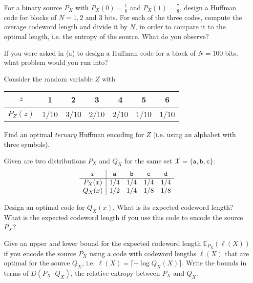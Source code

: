 \documentclass[a4paper,10pt,landscape,twocolumn]{scrartcl}
\begin{document}
\begin{exercise}
	\begin{subex}[(4pt)]
	For a binary source $P_X$ with $P_X(0) = \frac{1}{8}$ and $P_X(1) = \frac{7}{8}$, design a Huffman code for blocks of $N = 1,2$ and 3 bits. For each of the three codes, compute the average codeword length and divide it by $N$, in order to compare it to the optimal length, i.e. the entropy of the source. What do you observe?
	\end{subex}
	\begin{subex}[(1pt)]
	If you were asked in (a) to design a Huffman code for a block of $N = 100$ bits, what problem would you run into?
	\end{subex}
	\begin{subex}[(2pt)]
	Consider the random variable $Z$ with
	\begin{center}
	\begin{tabular}{c | c c c c c c}
	$z$ & 1 & 2 & 3 & 4 & 5 & 6\\
	\hline
	$P_Z(z)$ & 1/10 & 3/10 & 2/10 & 2/10 & 1/10 & 1/10\\
	\end{tabular}
	\end{center}
	Find an optimal \emph{ternary} Huffman encoding for $Z$ (i.e. using an alphabet with three symbols).
	\end{subex}
\end{exercise}



\begin{exercise}
Given are two distributions $P_X$ and $Q_X$ for the same set $\mathcal{X} = \{\mathtt{a,b,c}\}$:
\[
\begin{array}{c | c c c c}
x & \mathtt{a}&\mathtt{b}&\mathtt{c}&\mathtt{d}\\\hline
P_X(x) & 1/4&1/4&1/4&1/4\\
Q_X(x) & 1/2&1/4&1/8&1/8\\
\end{array}
\]
\begin{subex}[(2pt)]
Design an optimal code for $Q_X(x)$. What is its expected codeword length? What is the expected codeword length if you use this code to encode the source $P_X$?
\end{subex}
\begin{subex}[(4pt)]
Give an upper \emph{and} lower bound for the expected codeword length $\mathbb{E}_{P_X}(\ell(X))$ if you encode the source $P_X$ using a code with codeword lengths $\ell(X)$ that are optimal for the source $Q_X$, i.e. $\ell(X) = \lceil -\log Q_X(X)\rceil$. Write the bounds in terms of $D(P_X||Q_X)$, the relative entropy between $P_X$ and $Q_X$.
\end{subex}
\end{exercise}
\end{document}
